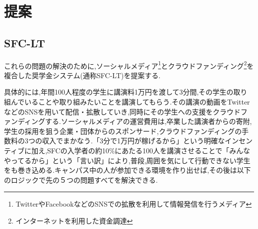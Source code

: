 \documentclass[uplatex, a4j]{jsarticle}
\begin{document}
\section{提案}
\subsection{SFC-LT}

これらの問題の解決のために,ソーシャルメディア\footnote{TwitterやFacebookなどのSNSでの拡散を利用して情報発信を行うメディア}とクラウドファンディング\footnote{インターネットを利用した資金調達}を複合した奨学金システム(通称SFC-LT)を提案する.

具体的には,年間100人程度の学生に講演料1万円を渡して3分間,その学生の取り組んでいることや取り組みたいことを講演してもらう.その講演の動画をTwitterなどのSNSを用いて配信・拡散していき,同時にその学生への支援をクラウドファンディングする.ソーシャルメディアの運営費用は,卒業した講演者からの寄附,学生の採用を狙う企業・団体からのスポンサード,クラウドファンディングの手数料の3つの収入でまかなう.「3分で1万円が稼げるから」という明確なインセンティブに加え,SFCの入学者の約10\%にあたる100人を講演させることで「みんなやってるから」という「言い訳」により,普段,周囲を気にして行動できない学生をも巻き込める.キャンパス中の人が参加できる環境を作り出せば,その後は以下のロジックで先の５つの問題すべてを解決できる.
\end{document}
